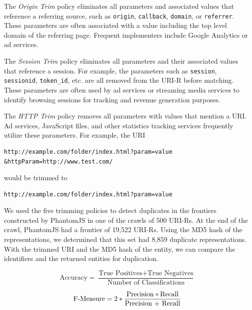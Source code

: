 \documentclass{ipres_proc_article-sp}
\begin{document}
 
The \emph{Origin Trim} policy eliminates all parameters and associated values that reference a referring source, such as \texttt{origin}, \texttt{callback}, \texttt{domain}, or \texttt{referrer}. These parameters are often associated with a value including the top level domain of the referring page. Frequent implementers include Google Analytics or ad services.

The \emph{Session Trim} policy eliminates all parameters and their associated values that reference a session. 
For example, the parameters such as \texttt{session}, \texttt{sessionid}, \texttt{token\_id}, etc. are all removed from the URI-R before matching. These parameters are often used by ad services or streaming media services to identify browsing sessions for tracking and revenue generation purposes.

The \emph{HTTP Trim} policy removes all parameters with values that mention a URI. Ad services, JavaScript files, and other statistics tracking services frequently utilize these parameters. 
For example, the URI 

\begin{verbatim}
http://example.com/folder/index.html?param=value
&httpParam=http://www.test.com/
\end{verbatim}

\noindent would be trimmed to 
 
\begin{verbatim}
http://example.com/folder/index.html?param=value
\end{verbatim}
  

We used the five trimming policies to detect duplicates in the frontiers constructed by PhantomJS in one of the crawls of 500 URI-Rs. At the end of the crawl, PhantomJS had a frontier of 19,522 URI-Rs. Using the MD5 hash of the representations, we determined that this set had 8,859 duplicate representations. With the trimmed URI and the MD5 hash of the entity, we can compare the identifiers and the returned entities for duplication. 


\begin{equation}
\label{acc}
\text{Accuracy} = \frac{\text{True Positives} + \text{True Negatives}}{\text{Number of Classifications}}
\end{equation}

\begin{equation}
\label{fmeas}
\text{F-Measure} = 2 * \frac{\text{Precision} * \text{Recall}}{\text{\text{Precision} + \text{Recall}}}
\end{equation}
\end{document}
